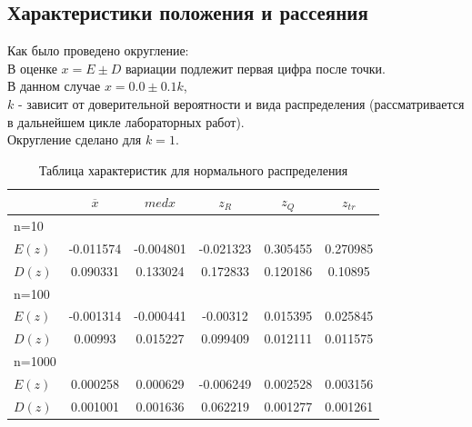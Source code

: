 \documentclass[a4paper,14pt]{article}
\begin{document}
	\subsection{Характеристики положения и рассеяния}
	Как было проведено округление:\\
	В оценке $x=E  \pm D$ вариации подлежит первая цифра после точки. \\
	В данном случае $x=0.0 \pm 0.1k$,\\
	$k$ - зависит от доверительной вероятности и вида распределения (рассматривается в дальнейшем цикле лабораторных работ). \\
	Округление сделано для  $k=1$.
	
	\begin{table}[H]
		\centering
		\begin{tabular}{|l||c|c|c|c|c|}
			\hline
			& $\overline{x}$ & $med x$ & $z_R$ & $z_Q$ & $z_{tr}$\\\hline\hline
			n=10 & & & & &\\\hline
			$E(z)$ & -0.011574 & -0.004801 & -0.021323 & 0.305455 & 0.270985\\\hline
			$D(z)$ & 0.090331 & 0.133024 & 0.172833 & 0.120186 & 0.10895\\\hline
			n=100 & & & & &\\\hline
			$E(z)$ & -0.001314 & -0.000441 & -0.00312 & 0.015395 & 0.025845\\\hline
			$D(z)$ & 0.00993 & 0.015227 & 0.099409 & 0.012111 & 0.011575\\\hline
			n=1000 & & & & &\\\hline
			$E(z)$ & 0.000258 & 0.000629 & -0.006249 & 0.002528 & 0.003156\\\hline
			$D(z)$ & 0.001001 & 0.001636 & 0.062219 & 0.001277 & 0.001261\\\hline
		\end{tabular}
		\caption{Таблица характеристик для нормального распределения}
		\label{tab:normal}
	\end{table}
	
\end{document}
